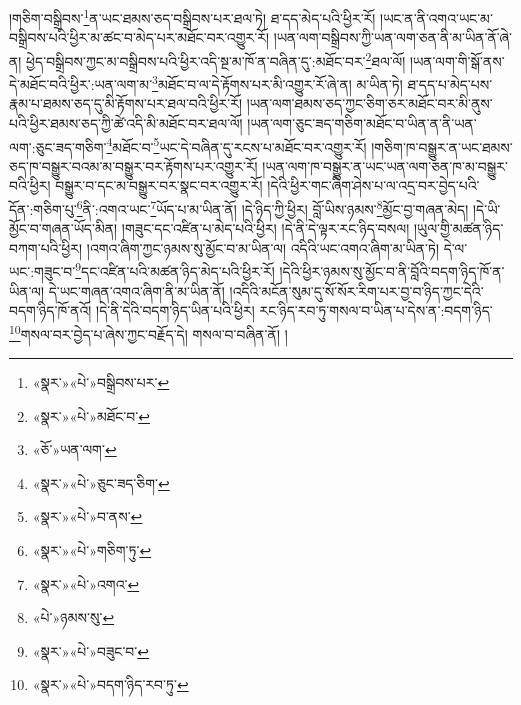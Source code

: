 །གཅིག་བསྒྲིབས་\footnote{«སྣར་»«པེ་»བསྒྲིབས་པར་}ན་ཡང་ཐམས་ཅད་བསྒྲིབས་པར་ཐལ་ཏེ། ཐ་དད་མེད་པའི་ཕྱིར་རོ། །ཡང་ན་ནི་འགའ་ཡང་མ་བསྒྲིབས་པའི་ཕྱིར་མ་ཚང་བ་མེད་པར་མཐོང་བར་འགྱུར་རོ། །ཡན་ལག་བསྒྲིབས་ཀྱི་ཡན་ལག་ཅན་ནི་མ་ཡིན་ནོ་ཞེ་ན། ཕྱེད་བསྒྲིབས་ཀྱང་མ་བསྒྲིབས་པའི་ཕྱིར་འདི་སྔ་མ་ཁོ་ན་བཞིན་དུ་:མཐོང་བར་\footnote{«སྣར་»«པེ་»མཐོང་བ་}ཐལ་ལོ། །ཡན་ལག་གི་སྒོ་ནས་དེ་མཐོང་བའི་ཕྱིར་:ཡན་ལག་མ་\footnote{«ཅོ་»ཡན་ལག་}མཐོང་བ་ལ་དེ་རྟོགས་པར་མི་འགྱུར་རོ་ཞེ་ན། མ་ཡིན་ཏེ། ཐ་དད་པ་མེད་པས་རྣམ་པ་ཐམས་ཅད་དུ་མི་རྟོགས་པར་ཐལ་བའི་ཕྱིར་རོ། །ཡན་ལག་ཐམས་ཅད་ཀྱང་ཅིག་ཅར་མཐོང་བར་མི་ནུས་པའི་ཕྱིར་ཐམས་ཅད་ཀྱི་ཚེ་འདི་མི་མཐོང་བར་ཐལ་ལོ། །ཡན་ལག་ཅུང་ཟད་གཅིག་མཐོང་བ་ཡིན་ན་ནི་ཡན་ལག་:ཅུང་ཟད་གཅིག་\footnote{«སྣར་»«པེ་»ཅུང་ཟད་ཅིག་}མཐོང་བ་\footnote{«སྣར་»«པེ་»བ་ནས་}ཡང་དེ་བཞིན་དུ་རངས་པ་མཐོང་བར་འགྱུར་རོ། །གཅིག་ཁ་བསྒྱུར་ན་ཡང་ཐམས་ཅད་ཁ་བསྒྱུར་བའམ་མ་བསྒྱུར་བར་རྟོགས་པར་འགྱུར་རོ། །ཡན་ལག་ཁ་བསྒྱུར་ན་ཡང་ཡན་ལག་ཅན་ཁ་མ་བསྒྱུར་བའི་ཕྱིར། བསྒྱུར་བ་དང་མ་བསྒྱུར་བར་སྣང་བར་འགྱུར་རོ། །དེའི་ཕྱིར་གང་ཞིག་ཤེས་པ་ལ་འདྲ་བར་བྱེད་པའི་དོན་:གཅིག་པུ་\footnote{«སྣར་»«པེ་»གཅིག་ཏུ་}ནི་:འགའ་ཡང་\footnote{«སྣར་»«པེ་»འགའ་}ཡོད་པ་མ་ཡིན་ནོ། །དེ་ཉིད་ཀྱི་ཕྱིར། བློ་ཡིས་ཉམས་\footnote{«པེ་»ཉམས་སུ་}མྱོང་བྱ་གཞན་མེད། །དེ་ཡི་མྱོང་བ་གཞན་ཡོད་མིན། །གཟུང་དང་འཛིན་པ་མེད་པའི་ཕྱིར། །དེ་ནི་དེ་ལྟར་རང་ཉིད་བསལ། །ཡུལ་གྱི་མཚན་ཉིད་བཀག་པའི་ཕྱིར། །འགའ་ཞིག་ཀྱང་ཉམས་སུ་མྱོང་བ་མ་ཡིན་ལ། འདིའི་ཡང་འགའ་ཞིག་མ་ཡིན་ཏེ། དེ་ལ་ཡང་:གཟུང་བ་\footnote{«སྣར་»«པེ་»བཟུང་བ་}དང་འཛིན་པའི་མཚན་ཉིད་མེད་པའི་ཕྱིར་རོ། །དེའི་ཕྱིར་ཉམས་སུ་མྱོང་བ་ནི་བློའི་བདག་ཉིད་ཁོ་ན་ཡིན་ལ། དེ་ཡང་གཞན་འགའ་ཞིག་ནི་མ་ཡིན་ནོ། །འདིའི་མངོན་སུམ་དུ་སོ་སོར་རིག་པར་བྱ་བ་ཉིད་ཀྱང་དེའི་བདག་ཉིད་ཁོ་ནའོ། །དེ་ནི་དེའི་བདག་ཉིད་ཡིན་པའི་ཕྱིར། རང་ཉིད་རབ་ཏུ་གསལ་བ་ཡིན་པ་དེས་ན་:བདག་ཉིད་\footnote{«སྣར་»«པེ་»བདག་ཉིད་རབ་ཏུ་}གསལ་བར་བྱེད་པ་ཞེས་ཀྱང་བརྗོད་དེ། གསལ་བ་བཞིན་ནོ། །
